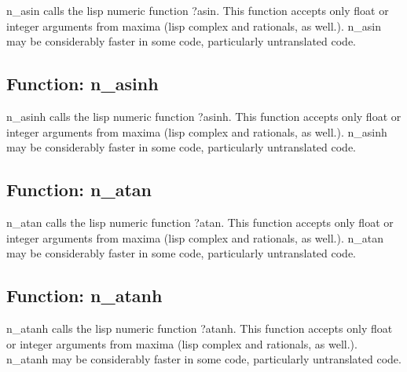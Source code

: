 \documentclass[]{article}
\begin{document}
\vspace{5 pt}
n\_asin calls the lisp numeric function ?asin. This function accepts only float or integer arguments from maxima (lisp complex and rationals, as well.). n\_asin may be considerably faster in some code, particularly untranslated code. 

\vspace{5 pt}


\subsection{Function: n\_asinh\label{sec:n_asinh}}
\hypertarget{n_asinh}{}



\vspace{5 pt}
n\_asinh calls the lisp numeric function ?asinh. This function accepts only float or integer arguments from maxima (lisp complex and rationals, as well.). n\_asinh may be considerably faster in some code, particularly untranslated code. 

\vspace{5 pt}


\subsection{Function: n\_atan\label{sec:n_atan}}
\hypertarget{n_atan}{}



\vspace{5 pt}
n\_atan calls the lisp numeric function ?atan. This function accepts only float or integer arguments from maxima (lisp complex and rationals, as well.). n\_atan may be considerably faster in some code, particularly untranslated code. 

\vspace{5 pt}


\subsection{Function: n\_atanh\label{sec:n_atanh}}
\hypertarget{n_atanh}{}



\vspace{5 pt}
n\_atanh calls the lisp numeric function ?atanh. This function accepts only float or integer arguments from maxima (lisp complex and rationals, as well.). n\_atanh may be considerably faster in some code, particularly untranslated code. 
\end{document}
